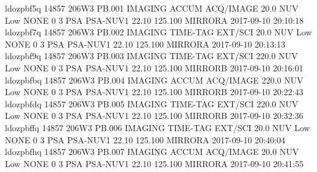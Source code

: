 ldozpbf5q 14857 206W3 PB.001 IMAGING ACCUM ACQ/IMAGE 20.0 NUV Low NONE 0 3 PSA PSA-NUV1 22.10 125.100 MIRRORA 2017-09-10 20:10:18
ldozpbf7q 14857 206W3 PB.002 IMAGING TIME-TAG EXT/SCI 20.0 NUV Low NONE 0 3 PSA PSA-NUV1 22.10 125.100 MIRRORA 2017-09-10 20:13:13
ldozpbf9q 14857 206W3 PB.003 IMAGING TIME-TAG EXT/SCI 220.0 NUV Low NONE 0 3 PSA PSA-NUV1 22.10 125.100 MIRRORB 2017-09-10 20:16:01
ldozpbfbq 14857 206W3 PB.004 IMAGING ACCUM ACQ/IMAGE 220.0 NUV Low NONE 0 3 PSA PSA-NUV1 22.10 125.100 MIRRORB 2017-09-10 20:22:43
ldozpbfdq 14857 206W3 PB.005 IMAGING TIME-TAG EXT/SCI 220.0 NUV Low NONE 0 3 PSA PSA-NUV1 22.10 125.100 MIRRORB 2017-09-10 20:32:36
ldozpbffq 14857 206W3 PB.006 IMAGING TIME-TAG EXT/SCI 20.0 NUV Low NONE 0 3 PSA PSA-NUV1 22.10 125.100 MIRRORA 2017-09-10 20:40:04
ldozpbfhq 14857 206W3 PB.007 IMAGING ACCUM ACQ/IMAGE 20.0 NUV Low NONE 0 3 PSA PSA-NUV1 22.10 125.100 MIRRORA 2017-09-10 20:41:55
